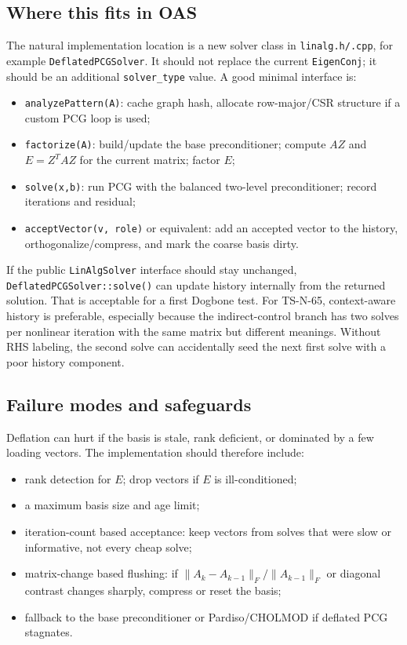 \documentclass[10pt,a4paper]{article}
\newcommand{\code}[1]{\texttt{#1}}
\begin{document}
\subsection*{Where this fits in OAS}

The natural implementation location is a new solver class in \code{linalg.h/.cpp}, for example \code{DeflatedPCGSolver}. It should not replace the current \code{EigenConj}; it should be an additional \code{solver\_type} value. A good minimal interface is:
\begin{itemize}
  \item \code{analyzePattern(A)}: cache graph hash, allocate row-major/CSR structure if a custom PCG loop is used;
  \item \code{factorize(A)}: build/update the base preconditioner; compute $AZ$ and $E=Z^TAZ$ for the current matrix; factor $E$;
  \item \code{solve(x,b)}: run PCG with the balanced two-level preconditioner; record iterations and residual;
  \item \code{acceptVector(v, role)} or equivalent: add an accepted vector to the history, orthogonalize/compress, and mark the coarse basis dirty.
\end{itemize}

If the public \code{LinAlgSolver} interface should stay unchanged, \code{DeflatedPCGSolver::solve()} can update history internally from the returned solution. That is acceptable for a first Dogbone test. For TS-N-65, context-aware history is preferable, especially because the indirect-control branch has two solves per nonlinear iteration with the same matrix but different meanings. Without RHS labeling, the second solve can accidentally seed the next first solve with a poor history component.

\subsection*{Failure modes and safeguards}

Deflation can hurt if the basis is stale, rank deficient, or dominated by a few loading vectors. The implementation should therefore include:
\begin{itemize}
  \item rank detection for $E$; drop vectors if $E$ is ill-conditioned;
  \item a maximum basis size and age limit;
  \item iteration-count based acceptance: keep vectors from solves that were slow or informative, not every cheap solve;
  \item matrix-change based flushing: if $\lVert A_k-A_{k-1}\rVert_F/\lVert A_{k-1}\rVert_F$ or diagonal contrast changes sharply, compress or reset the basis;
  \item fallback to the base preconditioner or Pardiso/CHOLMOD if deflated PCG stagnates.
\end{itemize}
\end{document}

